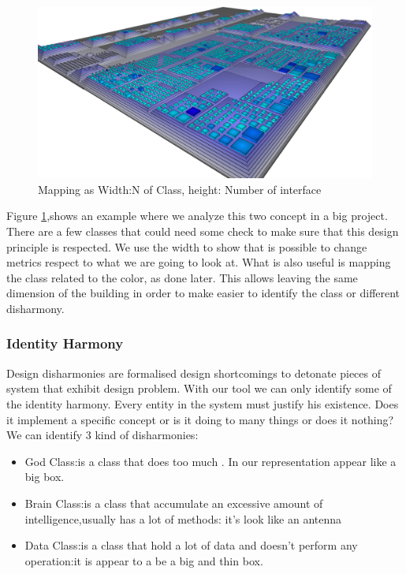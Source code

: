 \documentclass[]{usiinfbachelorproject}
\begin{document}
\begin{figure}[H]
\centering
\includegraphics[width=.60\textwidth]{images/ClassesAndInterfaces}
\caption[Classes and Interfaces Mapping]{Mapping as Width:N of Class, height: Number of interface \label{fig:classInterface}
}
	
\end{figure}

Figure \ref{fig:classInterface},shows an example where we analyze this two concept in a big project. There are a few classes that could need some check to make sure that this design principle is respected. We use the width to show that is possible to change metrics respect to what we are going to look at. What is also useful is mapping the class related to the color, as done later. This allows leaving the same dimension of the building in order to make easier to identify the class or different disharmony.



\subsubsection{Identity Harmony	}\label{sec:idHarmony}
Design disharmonies are formalised design shortcomings to detonate pieces of system that exhibit design problem. With our tool we can only identify some of the identity harmony. Every entity in the system must justify his existence. Does it implement a specific concept or is it doing to many things or does  it nothing?\\

We can identify 3 kind of disharmonies:
\begin{itemize}

\item{God Class}:is a class that does too much . In our representation appear like a big box.
\item{Brain Class}:is a class that accumulate an excessive amount of intelligence,usually has a lot of methods: it's look like an antenna
\item{Data Class}:is a class that hold a lot of data and doesn't perform any operation:it is appear to a be a big and thin box.

\end{itemize} 
\end{document}
